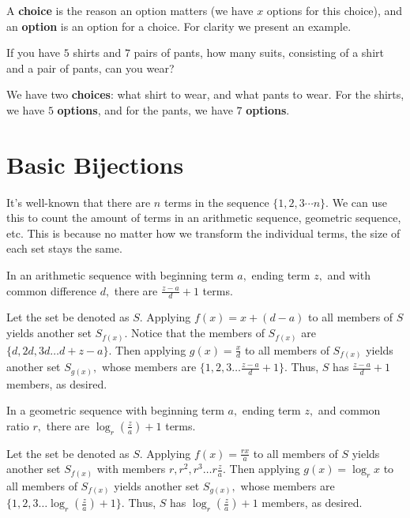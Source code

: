 \documentclass{article}
\begin{document}
\begin{defi}
A \textbf{choice} is the reason an option matters (we have $x$ options for this choice), and an \textbf{option} is an option for a choice. For clarity we present an example.
\end{defi}

\begin{exam}
If you have $5$ shirts and $7$ pairs of pants, how many suits, consisting of a shirt and a pair of pants, can you wear?
\end{exam}

\begin{sol}
We have two \textbf{choices}: what shirt to wear, and what pants to wear. For the shirts, we have $5$ \textbf{options}, and for the pants, we have $7$ \textbf{options}.
\end{sol}

\section{Basic Bijections}

It's well-known that there are $n$ terms in the sequence $\{1,2,3\cdots n\}.$ We can use this to count the amount of terms in an arithmetic sequence, geometric sequence, etc. This is because no matter how we transform the individual terms, the size of each set stays the same.

\begin{theo}
In an arithmetic sequence with beginning term $a,$ ending term $z,$ and with common difference $d,$ there are $\frac{z-a}{d}+1$ terms.
\end{theo}

\begin{pro}
Let the set be denoted as $S.$ Applying $f(x)=x+(d-a)$ to all members of $S$ yields another set $S_{f(x)}.$ Notice that the members of $S_{f(x)}$ are $\{d,2d,3d\dots d+z-a\}.$ Then applying $g(x)=\frac{x}{d}$ to all members of $S_{f(x)}$ yields another set $S_{g(x)},$ whose members are $\{1,2,3\dots \frac{z-a}{d}+1\}.$ Thus, $S$ has $\frac{z-a}{d}+1$ members, as desired.
\end{pro}

\begin{theo}
In a geometric sequence with beginning term $a,$ ending term $z,$ and common ratio $r,$ there are $\log_r(\frac{z}{a})+1$ terms.
\end{theo}

\begin{pro}
Let the set be denoted as $S.$ Applying $f(x)=\frac{rx}{a}$ to all members of $S$ yields another set $S_{f(x)}$ with members $r,r^2,r^3\dots r\frac{z}{a}.$ Then applying $g(x)=\log_r{x}$ to all members of $S_{f(x)}$ yields another set $S_{g(x)},$ whose members are $\{1,2,3\dots\log_r(\frac{z}{a})+1\}.$ Thus, $S$ has $\log_r(\frac{z}{a})+1$ members, as desired.
\end{pro}
\end{document}
